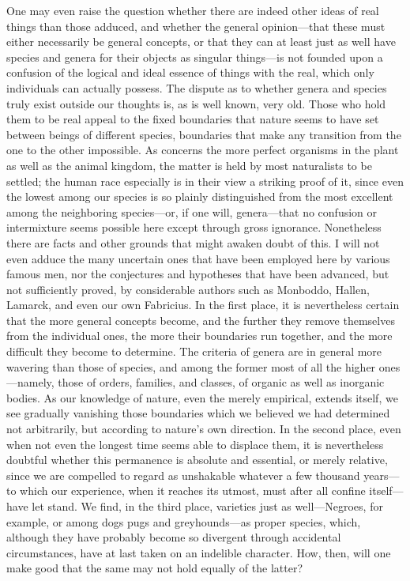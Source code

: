 \documentclass[12pt,a4paper]{article}
\begin{document}
One may even raise the question whether there are indeed other ideas of real
things than those adduced, and whether the general opinion---that these must
either necessarily be general concepts, or that they can at least just as well
have species
and genera for their objects as singular things---is not founded upon a
confusion of the logical and ideal essence of things with the real, which only
individuals can actually possess. The dispute as to whether genera and species
truly exist outside our thoughts is, as is well known, very old. Those who hold
them to be real appeal to the fixed boundaries that nature seems to have set
between beings of different species, boundaries that make any transition from
the one to the other impossible. As concerns the more perfect organisms in the
plant as well as the animal kingdom, the matter is held by most naturalists to
be settled; the human race especially is in their view a striking proof of it,
since even the lowest among our species is so plainly distinguished from the
most excellent among the neighboring species---or, if one will, genera---that no
confusion or intermixture seems possible here except through gross ignorance.
Nonetheless there are facts and other grounds that might awaken doubt of this. I
will not even adduce the many uncertain ones that have been employed here by
various famous men, nor the conjectures and hypotheses that have been advanced,
but not sufficiently proved, by considerable authors such as Monboddo, Hallen,
Lamarck, and even our own Fabricius. In the first place, it is nevertheless
certain that the more general concepts become, and the further they remove
themselves from the individual ones, the more their boundaries run together, and
the more difficult they become to determine. The criteria of genera are in
general more wavering than those of species, and among the former most of all
the higher ones---namely, those of orders, families, and classes, of organic as
well as inorganic bodies. As our knowledge of nature, even the merely empirical,
extends itself, we see gradually vanishing those boundaries
which we believed we had determined not arbitrarily, but according to nature's
own direction. In the second place, even when not even the longest time seems
able to displace them, it is nevertheless doubtful whether this permanence is
absolute and essential, or merely relative, since we are compelled to regard as
unshakable whatever a few thousand years---to which our experience, when it
reaches its utmost, must after all confine itself---have let stand. We find, in
the third place, varieties just as well---Negroes, for example, or among dogs
pugs and greyhounds---as proper species, which, although they have probably
become so divergent through accidental circumstances, have at last taken on an
indelible character. How, then, will one make good that the same may not hold
equally of the latter?
\end{document}
